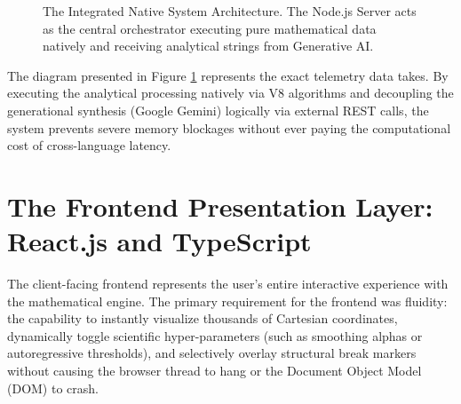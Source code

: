 \begin{figure}[H]
\centering
{}
\caption{The Integrated Native System Architecture. The Node.js Server acts as the central orchestrator executing pure mathematical data natively and receiving analytical strings from Generative AI.}
\label{fig:sys_arch}
\end{figure}

The diagram presented in Figure \ref{fig:sys_arch} represents the exact telemetry data takes. By executing the analytical processing natively via V8 algorithms and decoupling the generational synthesis (Google Gemini) logically via external REST calls, the system prevents severe memory blockages without ever paying the computational cost of cross-language latency.

\section{The Frontend Presentation Layer: React.js and TypeScript}

The client-facing frontend represents the user's entire interactive experience with the mathematical engine. The primary requirement for the frontend was fluidity: the capability to instantly visualize thousands of Cartesian coordinates, dynamically toggle scientific hyper-parameters (such as smoothing alphas or autoregressive thresholds), and selectively overlay structural break markers without causing the browser thread to hang or the Document Object Model (DOM) to crash.

